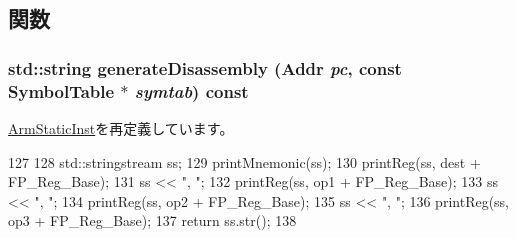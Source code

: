 \subsection{関数}
\hypertarget{classArmISA_1_1FpRegRegRegRegOp_a95d323a22a5f07e14d6b4c9385a91896}{
\subsubsection[{generateDisassembly}]{\setlength{\rightskip}{0pt plus 5cm}std::string generateDisassembly ({\bf Addr} {\em pc}, \/  const SymbolTable $\ast$ {\em symtab}) const}}
\label{classArmISA_1_1FpRegRegRegRegOp_a95d323a22a5f07e14d6b4c9385a91896}


\hyperlink{classArmISA_1_1ArmStaticInst_a95d323a22a5f07e14d6b4c9385a91896}{ArmStaticInst}を再定義しています。


\begin{DoxyCode}
127 {
128     std::stringstream ss;
129     printMnemonic(ss);
130     printReg(ss, dest + FP_Reg_Base);
131     ss << ", ";
132     printReg(ss, op1 + FP_Reg_Base);
133     ss << ", ";
134     printReg(ss, op2 + FP_Reg_Base);
135     ss << ", ";
136     printReg(ss, op3 + FP_Reg_Base);
137     return ss.str();
138 }
\end{DoxyCode}


